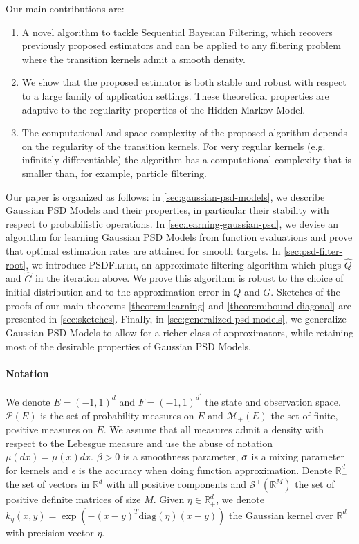 Our main contributions are:
 \begin{enumerate}
     \item A novel algorithm to tackle Sequential Bayesian Filtering, which recovers previously proposed estimators and can be applied to any filtering problem where the transition kernels admit a smooth density.
     \item We show that the proposed estimator is both stable and robust with respect to a large family of application settings. These theoretical properties are adaptive to the regularity properties of the Hidden Markov Model.
     \item The computational and space complexity of the proposed algorithm depends on the regularity of the transition kernels. For very regular kernels (e.g. infinitely differentiable) the algorithm has a computational complexity that is smaller than, for example, particle filtering.
 \end{enumerate}


Our paper is organized as follows: in \cref{sec:gaussian-psd-models}, we describe Gaussian PSD Models and their properties, in particular their stability with respect to probabilistic operations. In \cref{sec:learning-gaussian-psd}, we devise an algorithm for learning Gaussian PSD Models from function evaluations and prove that optimal estimation rates are attained for smooth targets. In \cref{sec:psd-filter-root}, we introduce \textsc{PSDFilter}, an approximate filtering algorithm which plugs $\hat Q$ and $\hat G$ in the iteration above. We prove this algorithm is robust to the choice of initial distribution and to the approximation error in $Q$ and $G$. Sketches of the proofs of our main theorems \cref{theorem:learning} and \cref{theorem:bound-diagonal} are presented in \cref{sec:sketches}. Finally, in \cref{sec:generalized-psd-models}, we generalize Gaussian PSD Models to allow for a richer class of approximators, while retaining most of the desirable properties of Gaussian PSD Models.

\paragraph{Notation} We denote $E=(-1, 1)^d$ and $F = (-1, 1)^{d^\prime}$ the state and observation space. $\mathcal P(E)$ is the set of probability measures on $E$ and $\mathcal M_+(E)$ the set of finite, positive measures on $E$. We assume that all measures admit a density with respect to the Lebesgue measure and use the abuse of notation $\mu(dx)=\mu(x)dx$. $\beta>0$ is a smoothness parameter, $\sigma$ is a mixing parameter for kernels and $\epsilon$ is the accuracy when doing function approximation. Denote $\mathbb R^d_+$ the set of vectors in $\mathbb R^d$ with all positive components and $\mathcal S^+(\mathbb R^M)$ the set of positive definite matrices of size $M$. Given $\eta\in \mathbb R^d_+$, we denote $k_\eta(x, y) = \exp\left(- (x-y)^T\textrm{diag}(\eta)(x-y)\right)$ the Gaussian kernel over $\mathbb R^d$ with precision vector $\eta$.

